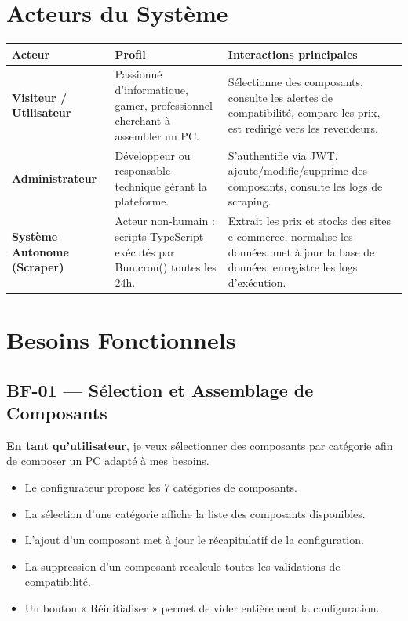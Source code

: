 \documentclass[12pt,a4paper]{article}
\begin{document}
\section{Acteurs du Système}

\begin{longtable}{>{\bfseries}p{3.5cm} p{4.5cm} p{6cm}}
\toprule
\textbf{Acteur} & \textbf{Profil} & \textbf{Interactions principales} \\
\midrule
\endhead
Visiteur / Utilisateur &
Passionné d'informatique, gamer, professionnel cherchant à assembler un PC. &
Sélectionne des composants, consulte les alertes de compatibilité, compare les prix, est redirigé vers les revendeurs. \\
\midrule
Administrateur &
Développeur ou responsable technique gérant la plateforme. &
S'authentifie via JWT, ajoute/modifie/supprime des composants, consulte les logs de scraping. \\
\midrule
Système Autonome (Scraper) &
Acteur non-humain : scripts TypeScript exécutés par Bun.cron() toutes les 24h. &
Extrait les prix et stocks des sites e-commerce, normalise les données, met à jour la base de données, enregistre les logs d'exécution. \\
\bottomrule
\end{longtable}

\section{Besoins Fonctionnels}

\subsection{BF-01 — Sélection et Assemblage de Composants}

\textbf{En tant qu'utilisateur}, je veux sélectionner des composants par catégorie afin de composer un PC adapté à mes besoins.

\begin{itemize}[label=\textbullet]
  \item Le configurateur propose les 7 catégories de composants.
  \item La sélection d'une catégorie affiche la liste des composants disponibles.
  \item L'ajout d'un composant met à jour le récapitulatif de la configuration.
  \item La suppression d'un composant recalcule toutes les validations de compatibilité.
  \item Un bouton « Réinitialiser » permet de vider entièrement la configuration.
\end{itemize}
\end{document}
